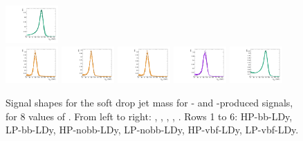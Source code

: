\begin{figure}[htbp]
  \includegraphics[width=0.18\textwidth]{fig/analysisAppendix/templateSignalVsMX_fromDC_WprToWH_MJJ_mu_HP_vbf_LDy.pdf}\\
  \includegraphics[width=0.18\textwidth]{fig/analysisAppendix/templateSignalVsMX_fromDC_GbuToWW_MJJ_mu_LP_vbf_LDy.pdf}
  \includegraphics[width=0.18\textwidth]{fig/analysisAppendix/templateSignalVsMX_fromDC_RadToWW_MJJ_mu_LP_vbf_LDy.pdf}
  \includegraphics[width=0.18\textwidth]{fig/analysisAppendix/templateSignalVsMX_fromDC_ZprToWW_MJJ_mu_LP_vbf_LDy.pdf}
  \includegraphics[width=0.18\textwidth]{fig/analysisAppendix/templateSignalVsMX_fromDC_WprToWZ_MJJ_mu_LP_vbf_LDy.pdf}
  \includegraphics[width=0.18\textwidth]{fig/analysisAppendix/templateSignalVsMX_fromDC_WprToWH_MJJ_mu_LP_vbf_LDy.pdf}\\
  \caption{
    Signal shapes for the soft drop jet mass \MJ for \ggF- and \DY-produced signals, for 8 values of \MX.
    From left to right: \GBulktoWW, \RadtoWW, \ZprtoWW, \WprtoWZ, \WprtoWH.
    Rows 1 to 6: HP-bb-LDy, LP-bb-LDy, HP-nobb-LDy, LP-nobb-LDy, HP-vbf-LDy, LP-vbf-LDy.
  }
  \label{fig:MJJShapes_NonVBF_LDy}
\end{figure}

